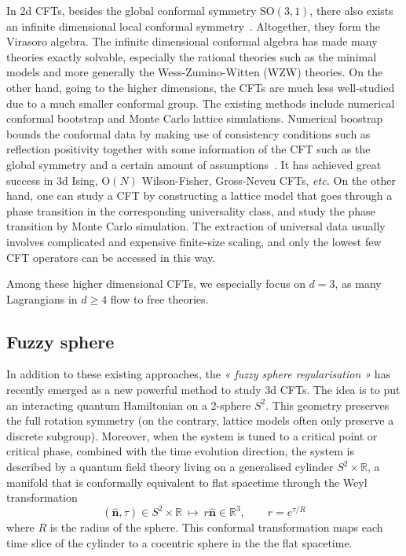 \documentclass{timesjhep}
\begin{document}
In 2d CFTs, besides the global conformal symmetry $\mathrm{SO}(3,1)$, there also exists an infinite dimensional local conformal symmetry~\cite{DiFrancesco1997CFT,Ginsparg1988CFT,Belavin1984BPZ}. Altogether, they form the Virasoro algebra. The infinite dimensional conformal algebra has made many theories exactly solvable, especially the rational theories such as the minimal models and more generally the Wess-Zumino-Witten (WZW) theories. On the other hand, going to the higher dimensions, the CFTs are much less well-studied due to a much smaller conformal group. The existing methods include numerical conformal bootstrap and Monte Carlo lattice simulations. Numerical boostrap bounds the conformal data by making use of consistency conditions such as reflection positivity together with some information of the CFT such as the global symmetry and a certain amount of assumptions~\cite{Poland2018Bootstrap,Rychkov2023Bootstrap}. It has achieved great success in 3d Ising, $\mathrm{O}(N)$ Wilson-Fisher, Gross-Neveu CFTs, \textit{etc.} On the other hand, one can study a CFT by constructing a lattice model that goes through a phase transition in the corresponding universality class, and study the phase transition by Monte Carlo simulation. The extraction of universal data usually involves complicated and expensive finite-size scaling, and only the lowest few CFT operators can be accessed in this way. 

Among these higher dimensional CFTs, we especially focus on $d=3$, as many Lagrangians in $d\ge 4$ flow to free theories. 

\subsection{Fuzzy sphere}

In addition to these existing approaches, the \textit{« fuzzy sphere regularisation »} has recently emerged as a new powerful method to study 3d CFTs. The idea is to put an interacting quantum Hamiltonian on a 2-sphere $S^2$. This geometry preserves the full rotation symmetry (on the contrary, lattice models often only preserve a discrete subgroup). Moreover, when the system is tuned to a critical point or critical phase, combined with the time evolution direction, the system is described by a quantum field theory living on a generalised cylinder $S^2\times\mathbb{R}$, a manifold that is conformally equivalent to flat spacetime through the Weyl transformation
\begin{equation}
    (\hat{\mathbf{n}},\tau)\in S^2\times\mathbb{R}\ \longmapsto\ r\hat{\mathbf{n}}\in\mathbb{R}^3,\qquad r=e^{\tau/R}
\end{equation}
where $R$ is the radius of the sphere. This conformal transformation maps each time slice of the cylinder to a cocentric sphere in the the flat spacetime. 
\end{document}
